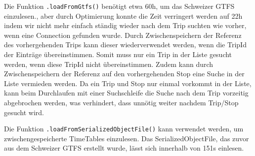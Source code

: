 Die Funktion \texttt{.loadFromGtfs()} benötigt etwa 60h, um das Schweizer GTFS einzulesen., aber durch Optimierung konnte die Zeit verringert werden auf 22h indem wir nicht mehr einfach ständig wieder nach dem Trip suchten wie vorher, wenn eine Connection gefunden wurde. Durch Zwischenspeichern der Referenz des vorhergehenden Trips kann dieser wiederverwendet werden, wenn die TripId der Einträge übereinstimmen. Somit muss nur ein Trip in der Liste gesucht werden, wenn diese TripId nicht übereinstimmen. Zudem kann durch Zwischenspeichern der Referenz auf den vorhergehenden Stop eine Suche in der Liste vermieden werden. Da ein Trip und Stop nur einmal vorkommt in der Liste, kann beim Durchlaufen mit einer Suchschleife die Suche nach dem Trip vorzeitig abgebrochen werden, was verhindert, dass unnötig weiter nachdem Trip/Stop gesucht wird.  \newline

Die Funktion \texttt{.loadFromSerializedObjectFile()} kann verwendet werden, um zwischengespeicherte TimeTables einzulesen. Das SerializedObjectFile, das zuvor aus dem Schweizer GTFS erstellt wurde, lässt sich innerhalb von 151s einlesen.

